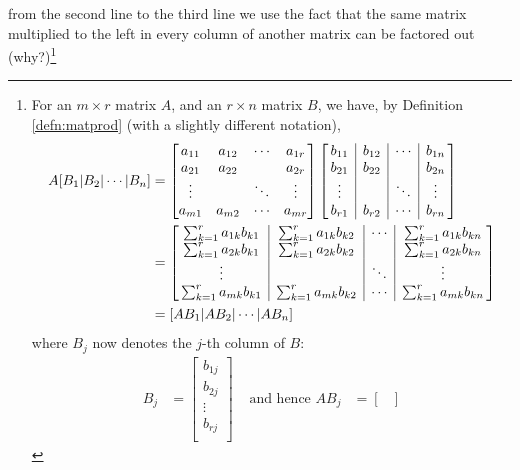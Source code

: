 from the second line to the third line we use the fact that the same matrix multiplied to the left in every column of another matrix can be factored out (why?)\footnote{\label{foot:factorleftmatrix} For an $m \times r$ matrix $A$, and an $r \times n$ matrix $B$, we have, by Definition \ref{defn:matprod} (with a slightly different notation),
\begin{align*}
A[B_1|B_2|\cdots|B_n] &= \begin{bmatrix}
a_{11} & a_{12} & \cdots & a_{1r} \\
a_{21} & a_{22} & & a_{2r} \\
\vdots & & \ddots & \vdots \\
a_{m1} & a_{m2} & \cdots & a_{mr} \\
\end{bmatrix}
\left[\begin{array}{@{\,}c|c|c|c@{\,}}
b_{11} & b_{12} & \cdots & b_{1n} \\
b_{21} & b_{22} & & b_{2n} \\
\vdots & & \ddots & \vdots \\
b_{r1} & b_{r2} & \cdots & b_{rn} \\    
\end{array}\right] \\
&=
\left[\begin{array}{@{\,}c|c|c|c@{\,}}
\sum_{k=1}^r a_{1k}b_{k1} & \sum_{k=1}^r a_{1k}b_{k2} & \cdots & \sum_{k=1}^r a_{1k}b_{kn} \\
\sum_{k=1}^r a_{2k}b_{k1} & \sum_{k=1}^r a_{2k}b_{k2} & & \sum_{k=1}^r a_{2k}b_{kn} \\
\vdots & & \ddots & \vdots \\
\sum_{k=1}^r a_{mk}b_{k1} & \sum_{k=1}^r a_{mk}b_{k2} & \cdots & \sum_{k=1}^r a_{mk}b_{kn} \\
\end{array}\right] \\
&=
[AB_1|AB_2|\cdots|AB_n]
\end{align*}
\vspace{\maxdimen}
where $B_j$ now denotes the $j$-th column of $B$:
\begin{align*}
B_j &= \begin{bmatrix}
b_{1j} \\
b_{2j} \\
\vdots \\
b_{rj} \\
\end{bmatrix}
&
\text{ and hence }
AB_j &= \begin{bmatrix}

\end{bmatrix}
\end{align*}}
